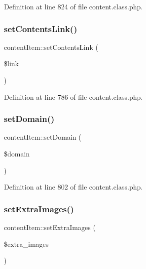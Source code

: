 Definition at line 824 of file content.\+class.\+php.

\mbox{\label{classcontentItem_afe78ae4ab14d74305c86d27570d9a7f8}} 
\subsubsection{\texorpdfstring{set\+Contents\+Link()}{setContentsLink()}}
{\footnotesize\ttfamily content\+Item\+::set\+Contents\+Link (\begin{DoxyParamCaption}\item[{}]{\$link }\end{DoxyParamCaption})}



Definition at line 786 of file content.\+class.\+php.

\mbox{\label{classcontentItem_a61b6be878a0183cd1c3dfde8f29d5c20}} 
\subsubsection{\texorpdfstring{set\+Domain()}{setDomain()}}
{\footnotesize\ttfamily content\+Item\+::set\+Domain (\begin{DoxyParamCaption}\item[{}]{\$domain }\end{DoxyParamCaption})}



Definition at line 802 of file content.\+class.\+php.

\mbox{\label{classcontentItem_a8f635dff719c18bf5e969b13ca901c74}} 
\subsubsection{\texorpdfstring{set\+Extra\+Images()}{setExtraImages()}}
{\footnotesize\ttfamily content\+Item\+::set\+Extra\+Images (\begin{DoxyParamCaption}\item[{}]{\$extra\+\_\+images }\end{DoxyParamCaption})}



